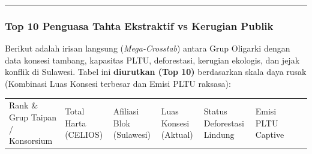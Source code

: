 \documentclass[
]{article}
\newcounter{none} %
\begin{document}
\begin{center}\rule{0.5\linewidth}{0.5pt}\end{center}

\subsubsection{Top 10 Penguasa Tahta Ekstraktif vs Kerugian
Publik}\label{top-10-penguasa-tahta-ekstraktif-vs-kerugian-publik}

Berikut adalah irisan langsung (\emph{Mega-Crosstab}) antara Grup
Oligarki dengan data konsesi tambang, kapasitas PLTU, deforestasi,
kerugian ekologis, dan jejak konflik di Sulawesi. Tabel ini
\textbf{diurutkan (Top 10)} berdasarkan skala daya rusak (Kombinasi Luas
Konsesi terbesar dan Emisi PLTU raksasa):

{\def\LTcaptype{none} %
\begin{longtable}[]{@{}
  >{\raggedright\arraybackslash}p{}
  >{\raggedright\arraybackslash}p{}
  >{\raggedright\arraybackslash}p{}
  >{\raggedright\arraybackslash}p{}
  >{\raggedright\arraybackslash}p{}
  >{\raggedright\arraybackslash}p{}
  >{\raggedright\arraybackslash}p{}
  >{\raggedright\arraybackslash}p{}@{}}
\toprule\noalign{}
\begin{minipage}[b]{\linewidth}\raggedright
Rank \& Grup Taipan / Konsorsium
\end{minipage} & \begin{minipage}[b]{\linewidth}\raggedright
Total Harta (CELIOS)
\end{minipage} & \begin{minipage}[b]{\linewidth}\raggedright
Afiliasi Blok (Sulawesi)
\end{minipage} & \begin{minipage}[b]{\linewidth}\raggedright
Luas Konsesi (Aktual)
\end{minipage} & \begin{minipage}[b]{\linewidth}\raggedright
Status Deforestasi Lindung
\end{minipage} & \begin{minipage}[b]{\linewidth}\raggedright
Emisi PLTU Captive
\end{minipage} & \begin{minipage}[b]{\linewidth}\raggedright

\end{minipage}
\end{longtable}}
\end{document}
